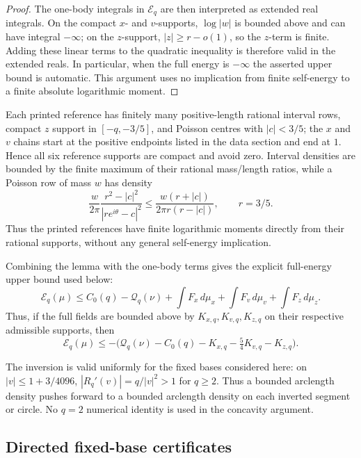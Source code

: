\begin{proof}
The one-body integrals in $\mathcal E_q$ are then interpreted as extended
real integrals.  On the compact $x$- and $v$-supports, $\log|w|$ is bounded
above and can have integral $-\infty$; on the $z$-support, $|z|\ge r-o(1)$,
so the $z$-term is finite.  Adding these linear terms to the quadratic
inequality is therefore valid in the extended reals.  In particular, when
the full energy is $-\infty$ the asserted upper bound is automatic.  This
argument uses no implication from finite self-energy to a finite absolute
logarithmic moment.
\end{proof}

Each printed reference has finitely many positive-length rational interval
rows, compact $z$ support in $[-q,-3/5]$, and Poisson centres with
$|c|<3/5$; the $x$ and $v$ chains start at the positive endpoints listed in
the data section and end at $1$.  Hence all six reference supports are
compact and avoid zero.  Interval densities are bounded by the finite
maximum of their rational mass/length ratios, while a Poisson row of mass
$w$ has density
\[
 \frac{w}{2\pi}\frac{r^2-|c|^2}{|re^{i\theta}-c|^2}
 \le\frac{w(r+|c|)}{2\pi r(r-|c|)},\qquad r=3/5.
\]
Thus the printed references have finite logarithmic moments directly from
their rational supports, without any general self-energy implication.

Combining the lemma with the one-body terms gives the explicit full-energy
upper bound used below:
\begin{equation}\label{eq:v-full-energy-dual}
 \mathcal E_q(\mu)
 \le C_0(q)-\mathcal Q_q(\nu)
      +\int F_x\,d\mu_x+\int F_v\,d\mu_v+\int F_z\,d\mu_z.
\end{equation}
Thus, if the full fields are bounded above by $K_{x,q},K_{v,q},K_{z,q}$
on their respective admissible supports, then
\begin{equation}\label{eq:v-energy-bound}
 \mathcal E_q(\mu)\le -\bigl(\mathcal Q_q(\nu)-C_0(q)-K_{x,q}
                         -\tfrac54K_{v,q}-K_{z,q}\bigr).
\end{equation}

The inversion is valid uniformly for the fixed bases considered here:
on $|v|\le1+3/4096$,
$|R_q'(v)|=q/|v|^2>1$ for $q\ge2$.  Thus a bounded arclength density
pushes forward to a bounded arclength density on each inverted segment or
circle.  No $q=2$ numerical identity is used in the concavity argument.

\subsection{Directed fixed-base certificates}

